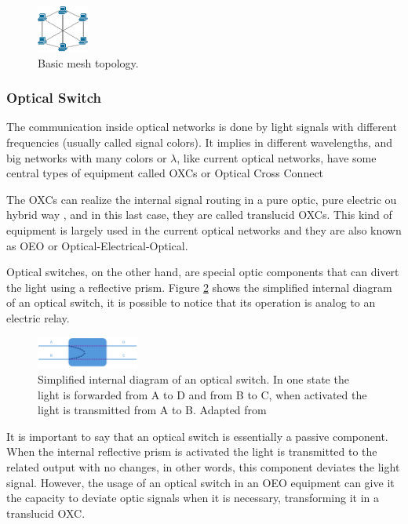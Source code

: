 \documentclass[conference]{IEEEtran}
\begin{document}
\begin{figure}[htbp]
	\centering
	\includegraphics[width=0.15\textwidth]{./figuras/Topologia-Mesh.jpg} %
	\caption{Basic mesh topology.}
	\label{fig_topologia_multiplo_mesh}
\end{figure}

\subsubsection{Optical Switch}
The communication inside optical networks is done by light signals with different frequencies (usually called signal colors). It implies in different wavelengths, and big networks with many colors or $\lambda$, like current optical networks, have some central types of equipment called OXCs or Optical Cross Connect

The OXCs can realize the internal signal routing in a pure optic, pure electric ou hybrid way \cite{Book-Ramaswami2010}, and in this last case, they are called translucid OXCs. This kind of equipment is largely used in the current optical networks and they are also known as OEO or Optical-Electrical-Optical.

Optical switches, on the other hand, are special optic components that can divert the light using a reflective prism. Figure \ref{fig_chaveador_optico} shows the simplified internal diagram of an optical switch, it is possible to notice that its operation is analog to an electric relay.

\begin{figure}[htbp]
	\centering
	\includegraphics[width=0.3\textwidth]{./figuras/Switch_optico.jpg} %
	\caption[Exemplo básico chaveador óptico]{Simplified internal diagram of an optical switch. In one state the light is forwarded from A to D and from B to C, when activated the light is transmitted from A to B. Adapted from \cite{Accelink2014}}
	\label{fig_chaveador_optico}
\end{figure}

It is important to say that an optical switch is essentially a passive component. When the internal reflective prism is activated the light is transmitted to the related output with no changes, in other words, this component deviates the light signal. However, the usage of an optical switch in an OEO equipment can give it the capacity to deviate optic signals when it is necessary, transforming it in a translucid OXC. 
\end{document}
